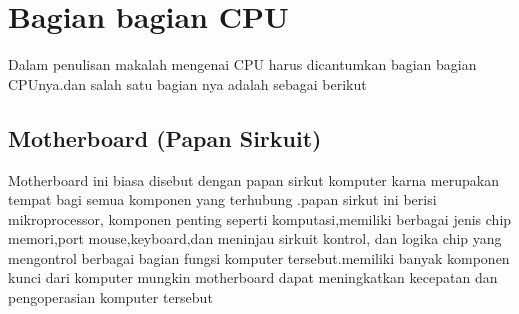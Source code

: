 \section{Bagian bagian CPU}
	Dalam penulisan makalah mengenai CPU harus dicantumkan bagian bagian CPUnya.dan salah satu bagian nya adalah sebagai berikut
	\subsection{Motherboard (Papan Sirkuit)}
		Motherboard ini biasa disebut dengan papan sirkut komputer karna merupakan tempat bagi semua komponen yang terhubung .papan sirkut ini berisi mikroprocessor, komponen penting seperti komputasi,memiliki berbagai jenis chip memori,port mouse,keyboard,dan meninjau sirkuit kontrol, dan logika chip yang mengontrol berbagai bagian fungsi komputer tersebut.memiliki banyak komponen kunci dari komputer mungkin motherboard dapat meningkatkan kecepatan dan pengoperasian komputer tersebut
